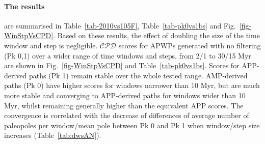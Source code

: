 \begin{table}[!ht]
  \centering
  \caption{Average number of paleopoles per window/mean pole for only Pk 0 (AMP
    with no weighting) and Pk 1 (APP with no weighting) from bin/step 2/1 Myr to
    30/15 Myr.}\label{tab:dwsAN}
\end{table}

\paragraph{The results}
are summarised in Table~\ref{tab-2010vs105F}, Table~\ref{tab-pk0vs1bs} and
Fig.~\ref{fig-WinStpVsCPD}. Based on these results, the effect of doubling the
size of the time window and step is negligible. $\mathcal{CPD}$ scores for APWPs
generated with no filtering (Pk 0,1) over a wider range of time windows and
steps, from 2/1 to 30/15 Myr are shown in Fig.~\ref{fig-WinStpVsCPD} and
Table~\ref{tab-pk0vs1bs}. Scores for APP-derived paths (Pk 1) remain stable over
the whole tested range. AMP-derived paths (Pk 0) have higher scores for windows
narrower than 10 Myr, but are much more stable and converging to APP-derived
paths for windows wider than 10 Myr, whilst remaining generally
higher than the equivalent APP scores. The convergence is correlated with the
decrease of differences of average number of paleopoles per window/mean pole
between Pk 0 and Pk 1 when window/step size increases (Table~\ref{tab:dwsAN}).


